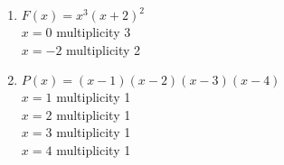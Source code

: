 \documentclass{ximera}
\begin{document}
\begin{enumerate}
\setcounter{enumi}{\value{HW}}

\item $F(x) = x^{3}(x + 2)^{2}$\\
$x = 0$ multiplicity 3\\
$x = -2$ multiplicity 2\\

%

\vfill


\item $P(x) = (x - 1)(x - 2)(x - 3)(x - 4)$\\
$x = 1$ multiplicity 1\\
$x = 2$ multiplicity 1\\
$x = 3$ multiplicity 1\\
$x = 4$ multiplicity 1\\

%

\setcounter{HW}{\value{enumi}}
\end{enumerate}
\end{document}
